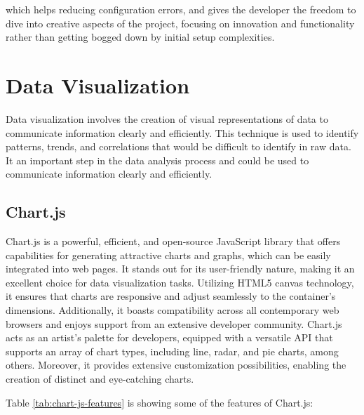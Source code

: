 which helps reducing configuration errors, and gives the developer the freedom to dive into creative aspects of the project, focusing on innovation and functionality rather than getting bogged down by initial setup complexities.


\section{Data Visualization}

Data visualization involves the creation of visual representations of data to communicate information clearly and efficiently. This technique is used to
identify patterns, trends, and correlations that would be difficult to identify in raw data. It an important step in the data analysis process and 
could be used to communicate information clearly and efficiently.

\subsection{Chart.js}


Chart.js is a powerful, efficient, and open-source JavaScript library that offers capabilities for generating attractive charts and graphs, which can be 
easily integrated into web pages. It stands out for its user-friendly nature, making it an excellent choice for data visualization tasks. Utilizing HTML5 
canvas technology, it ensures that charts are responsive and adjust seamlessly to the container's dimensions. Additionally, it boasts compatibility across 
all contemporary web browsers and enjoys support from an extensive developer community. Chart.js acts as an artist's palette for developers, equipped with 
a versatile API that supports an array of chart types, including line, radar, and pie charts, among others. Moreover, it provides extensive customization 
possibilities, enabling the creation of distinct and eye-catching charts.\cite{da2019learn}

Table \ref{tab:chart-js-features} is showing some of the features of Chart.js\cite{da2019learn}:

